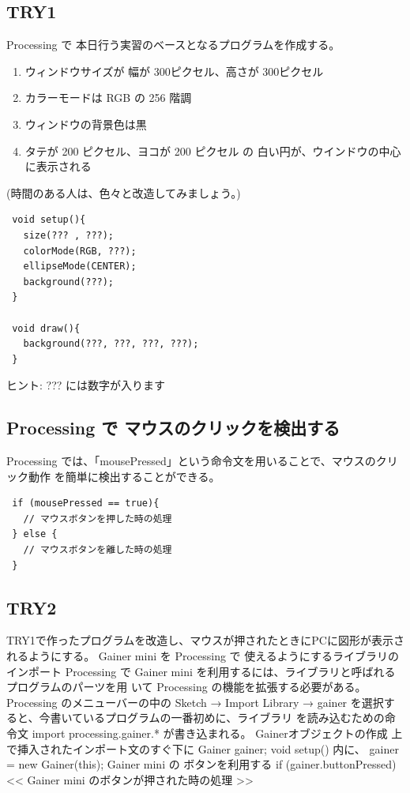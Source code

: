 \documentclass[11pt,a4paper]{jarticle}
\begin{document}
\subsection*{TRY1}
Processing で 本日行う実習のベースとなるプログラムを作成する。
\begin{enumerate}
 \item ウィンドウサイズが 幅が 300ピクセル、高さが 300ピクセル
 \item カラーモードは RGB の 256 階調
 \item ウィンドウの背景色は黒
 \item タテが 200 ピクセル、ヨコが 200 ピクセル の 白い円が、ウインドウの中心に表示される
\end{enumerate}
\begin{flushright}
 (時間のある人は、色々と改造してみましょう。) 
\end{flushright}

\begin{lstlisting}
 void setup(){
   size(??? , ???);
   colorMode(RGB, ???);
   ellipseMode(CENTER);
   background(???);
 }
 
 void draw(){
   background(???, ???, ???, ???);
 }
\end{lstlisting}

\begin{flushright}
 ヒント: ??? には数字が入ります
\end{flushright}


\subsection*{Processing で マウスのクリックを検出する}
Processing では、「mousePressed」という命令文を用いることで、マウスのクリック動作
を簡単に検出することができる。
\begin{lstlisting}
 if (mousePressed == true){
   // マウスボタンを押した時の処理
 } else {
   // マウスボタンを離した時の処理
 }
\end{lstlisting}

\subsection*{TRY2}
 TRY1で作ったプログラムを改造し、マウスが押されたときにPCに図形が表示されるようにする。
Gainer mini を Processing で 使えるようにするライブラリのインポート
 Processing で Gainer mini を利用するには、ライブラリと呼ばれるプログラムのパーツを用
いて Processing の機能を拡張する必要がある。Processing のメニューバーの中の Sketch →
Import Library → gainer を選択すると、今書いているプログラムの一番初めに、ライブラリ
を読み込むための命令文 import processing.gainer.* が書き込まれる。
Gainerオブジェクトの作成
上で挿入されたインポート文のすぐ下に
Gainer gainer;
void setup() 内に、
gainer = new Gainer(this);
Gainer mini の ボタンを利用する
if (gainer.buttonPressed){
<< Gainer mini のボタンが押された時の処理 >>
}
\end{document}
